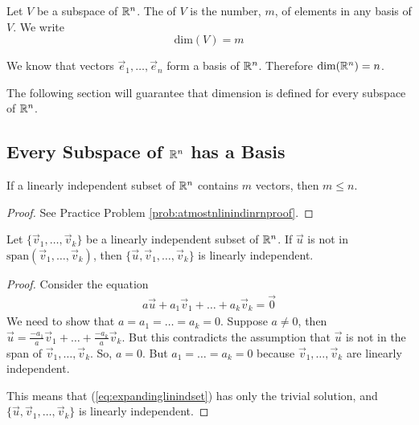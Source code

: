 \documentclass{ximera}
\begin{document}
\begin{definition}\label{def:dimension}
Let $V$ be a subspace of $\mathbb{R}^n$.  The  of $V$ is the number, $m$, of elements in any basis of $V$.  We write
$$\mbox{dim}(V)=m$$
\end{definition}

\begin{example}\label{ex:basisofrn}
We know that vectors $\vec{e}_1, \ldots ,\vec{e}_n$ form a basis of $\mathbb{R}^n$.  Therefore $\mbox{dim}(\mathbb{R}^n)=n$.
\end{example}

The following section will guarantee that dimension is defined for every subspace of $\mathbb{R}^n$.

\subsection*{Every Subspace of $\mathbb{R}^n$ has a Basis}

\begin{lemma}\label{lemma:atmostnlinindinrn}
If a linearly independent subset of $\mathbb{R}^n$ contains $m$ vectors, then $m\leq n$.
\end{lemma}
\begin{proof}
See Practice Problem \ref{prob:atmostnlinindinrnproof}.
\end{proof}

\begin{lemma}\label{lemma:expandinglinindset}
Let $\{\vec{v}_1,\ldots ,\vec{v}_k\}$ be a linearly independent subset of $\mathbb{R}^n$.  If $\vec{u}$ is not in $\mbox{span}(\vec{v}_1,\ldots ,\vec{v}_k)$, then $\{\vec{u},\vec{v}_1,\ldots ,\vec{v}_k\}$ is linearly independent.
\end{lemma}
\begin{proof}
Consider the equation
\begin{align}\label{eq:expandinglinindset}a\vec{u}+a_1\vec{v}_1+\ldots +a_k\vec{v}_k=\vec{0}\end{align}
We need to show that $a=a_1=\ldots =a_k=0$.  Suppose $a\neq 0$, then $\vec{u}=\frac{-a_1}{a}\vec{v}_1+\ldots +\frac{-a_k}{a}\vec{v}_k$.  But this contradicts the assumption that $\vec{u}$ is not in the span of $\vec{v}_1,\ldots ,\vec{v}_k$.  So, $a=0$.  But $a_1=\ldots =a_k=0$ because $\vec{v}_1,\ldots ,\vec{v}_k$ are linearly independent.

This means that (\ref{eq:expandinglinindset}) has only the trivial solution, and $\{\vec{u},\vec{v}_1,\ldots ,\vec{v}_k\}$ is linearly independent.
\end{proof}
\end{document}
